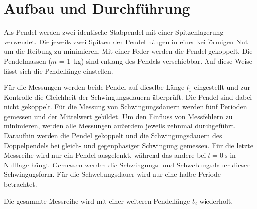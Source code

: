 \section{Aufbau und Durchführung}
\label{sec:Durchführung}

Als Pendel werden zwei identische Stabpendel mit einer
Spitzenlagerung verwendet.
Die jeweils zwei Spitzen der Pendel hängen in
einer keilförmigen Nut um die Reibung zu minimieren. Mit einer Feder werden
die Pendel gekoppelt. Die Pendelmassen ($m$ = \SI{1}{\kilo\gram})
sind entlang des Pendels verschiebbar.
Auf diese Weise lässt sich die Pendellänge einstellen.


Für die Messungen werden beide Pendel auf dieselbe Länge $l_1$
eingestellt und zur
Kontrolle die Gleichheit der Schwingungsdauern überprüft. Die Pendel
sind dabei nicht gekoppelt. Für die Messung von Schwingungsdauern werden
fünf Perioden gemessen und der Mittelwert gebildet.
Um den Einfluss von Messfehlern
zu minimieren, werden alle Messungen außerdem jeweils zehnmal durchgeführt.
Daraufhin werden die Pendel gekoppelt und die Schwingungsdauern des
Doppelpendels bei gleich- und gegenphasiger Schwingung gemessen.
Für die letzte Messreihe wird nur ein Pendel ausgelenkt, während das andere
bei $t = \SI{0}{\second}$ in Nulllage hängt. Gemessen werden die Schwingungs- und
Schwebungsdauer dieser Schwingugsform. Für die Schwebungsdauer wird nur eine
halbe Periode betrachtet.

Die gesammte Messreihe wird mit einer weiteren Pendellänge $l_2$ wiederholt.
